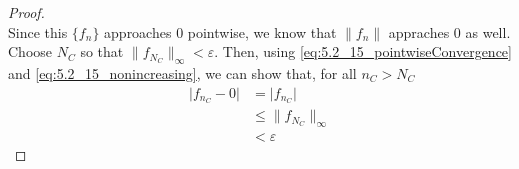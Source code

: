 \documentclass{article}
\begin{document}
\begin{enumerate}
\begin{proof}
\begin{equation}
                  \end{equation}
                  Since this $\{f_n\}$ approaches 0 pointwise, we know that $\lVert f_n\rVert$ appraches 0 as well.
                  Choose $N_C$ so that $\lVert f_{N_C}\rVert_\infty<\varepsilon$. Then, using \eqref{eq:5.2_15_pointwiseConvergence} and
                  \eqref{eq:5.2_15_nonincreasing}, we can show that, for all $n_C>N_C$
                  \begin{align*}
                        \lvert f_{n_C} - 0\rvert & = \lvert f_{n_C}\rvert           \\
                                                 & \leq \lVert f_{N_C}\rVert_\infty \\
                                                 & < \varepsilon
                  \end{align*}
            \end{proof}
\end{enumerate}
\end{document}
